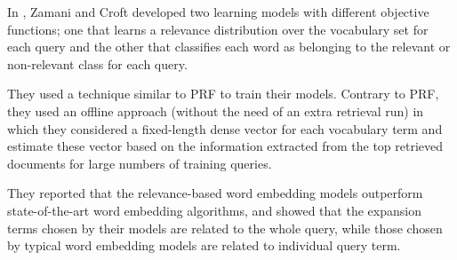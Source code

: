 In \cite{relbasedwe}, Zamani and Croft developed two learning models with different objective functions; one that learns a relevance distribution over the vocabulary set for each query and the other that classifies each word as belonging to the relevant or non-relevant class for each query.

They used a technique similar to PRF to train their models. Contrary to PRF, they used an offline approach (without the need of an extra retrieval run) in which they considered a fixed-length dense vector for each vocabulary term and estimate these vector based on the information extracted from the top retrieved documents for large numbers of training queries.

They reported that the relevance-based word embedding models outperform state-of-the-art word embedding algorithms, and showed that the expansion terms chosen by their models are related to the whole query, while those chosen by typical word embedding models are related to individual query term.